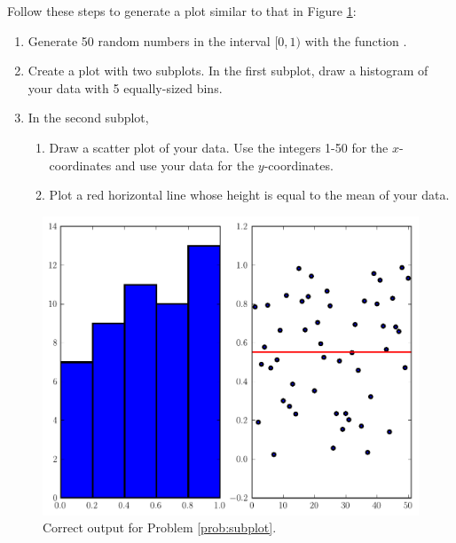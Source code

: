 \begin{problem}\label{prob:subplot}
Follow these steps to generate a plot similar to that in Figure \ref{fig:subplotProb}:
\begin{enumerate}
\item Generate 50 random numbers in the interval $[0,1)$ with the function .
\item Create a plot with two subplots.
In the first subplot, draw a histogram of your data with 5 equally-sized bins.
\item In the second subplot,
\begin{enumerate}
\item Draw a scatter plot of your data.
Use the integers 1-50 for the $x$-coordinates and use your data for the $y$-coordinates.
\item Plot a red horizontal line whose height is equal to the mean of your data.
\end{enumerate}
\end{enumerate}

\begin{figure}[H]
\includegraphics[width=.7\textwidth]{subplotProb.pdf}
\caption{Correct output for Problem \ref{prob:subplot}.}
\label{fig:subplotProb}
\end{figure}

\end{problem}

